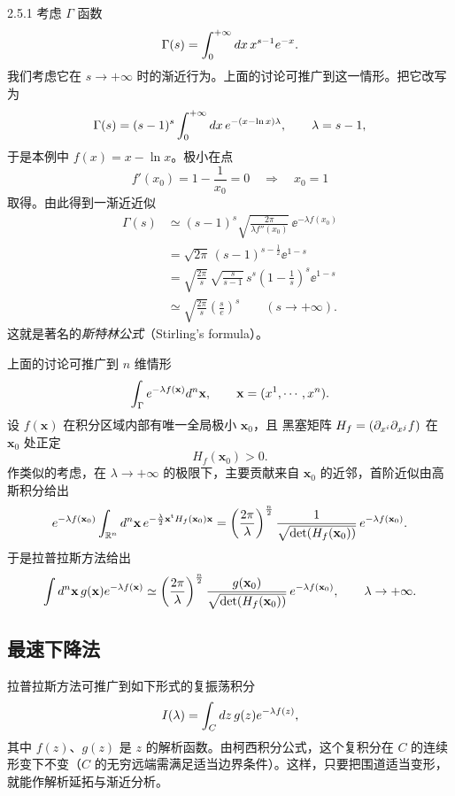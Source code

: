 \begin{example}{2.5.1}
考虑 $\Gamma$ 函数
\[
\Gamma(s)=\int_0^{+\infty}d x\,x^{s-1}e^{-x}.
\]
我们考虑它在 $s\to+\infty$ 时的渐近行为。上面的讨论可推广到这一情形。把它改写为
\[
\Gamma(s)=(s-1)^s\int_0^{+\infty}d x\,e^{-(x-\ln x)\lambda},
\qquad \lambda=s-1,
\]
于是本例中 $f(x)=x-\ln x$。极小在点
\[
f'(x_0)=1-\frac1{x_0}=0
\quad\Longrightarrow\quad
x_0=1
\]
取得。由此得到一渐近近似
\[
\begin{aligned}
\Gamma(s)&\simeq(s-1)^s\sqrt{\frac{2\pi}{\lambda f''(x_0)}}\,
\ee^{-\lambda f(x_0)}\\
&=\sqrt{2\pi}\,(s-1)^{s-\frac12}\ee^{1-s}\\
&=\sqrt{\frac{2\pi}{s}}\,\sqrt{\frac{s}{s-1}}\,s^s
\left(1-\frac1s\right)^s\ee^{1-s}\\
&\simeq\sqrt{\frac{2\pi}{s}}\left(\frac se\right)^s
\qquad (s\to+\infty).
\end{aligned}
\]
这就是著名的\emph{斯特林公式}（Stirling's formula）。
\end{example}

上面的讨论可推广到 $n$ 维情形
\[
\int_\Gamma e^{-\lambda f(\mathbf{x})}d^n\mathbf{x},
\qquad \mathbf{x}=(x^1,\cdots,x^n).
\]
设 $f(\mathbf{x})$ 在积分区域内部有唯一全局极小 $\mathbf{x}_0$，且 黑塞矩阵 $H_f=(\partial_{x^i}\partial_{x^j}f)$ 在 $\mathbf{x}_0$ 处正定
\[
H_f(\mathbf{x}_0)>0.
\]
作类似的考虑，在 $\lambda\to+\infty$ 的极限下，主要贡献来自 $\mathbf{x}_0$ 的近邻，首阶近似由高斯积分给出
\[
e^{-\lambda f(\mathbf{x}_0)}
\int_{\mathbb{R}^n}d^n\mathbf{x}\,
e^{-\frac\lambda2\mathbf{x}^{\mathrm{t}}H_f(\mathbf{x}_0)\mathbf{x}}
=\left(\frac{2\pi}{\lambda}\right)^{\frac n2}
\frac{1}{\sqrt{\det(H_f(\mathbf{x}_0))}}\,e^{-\lambda f(\mathbf{x}_0)}.
\]
于是拉普拉斯方法给出
\[
\int d^n\mathbf{x}\,g(\mathbf{x})e^{-\lambda f(\mathbf{x})}
\simeq\left(\frac{2\pi}{\lambda}\right)^{\frac n2}
\frac{g(\mathbf{x}_0)}{\sqrt{\det(H_f(\mathbf{x}_0))}}\,
e^{-\lambda f(\mathbf{x}_0)},
\qquad \lambda\to+\infty.
\]

\subsection{最速下降法}

拉普拉斯方法可推广到如下形式的复振荡积分
\[
I(\lambda)=\int_Cd z\,g(z)e^{-\lambda f(z)},
\]
其中 $f(z)$、$g(z)$ 是 $z$ 的解析函数。由柯西积分公式，这个复积分在 $C$ 的连续形变下不变（$C$ 的无穷远端需满足适当边界条件）。这样，只要把围道适当变形，就能作解析延拓与渐近分析。


